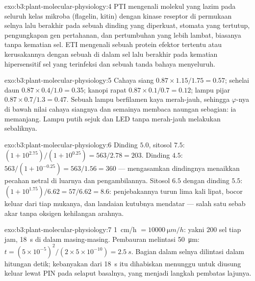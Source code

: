 \begin{solution}{exo:b3:plant-molecular-physiology:4}
PTI mengenali molekul yang lazim pada seluruh kelas mikroba
(flagelin, kitin) dengan kinase reseptor di permukaan selnya lalu berakhir
pada sebuah dinding yang diperkuat, stomata yang tertutup, pengungkapan gen pertahanan, dan
pertumbuhan yang lebih lambat, biasanya tanpa kematian sel. ETI mengenali sebuah
protein efektor tertentu atau kerusakannya dengan sebuah  di dalam sel lalu
berakhir pada kematian hipersensitif sel yang terinfeksi dan sebuah tanda bahaya
menyeluruh.
\end{solution}

\begin{solution}{exo:b3:plant-molecular-physiology:5}
Cahaya siang $0.87\times 1.15/1.75 = 0.57$; sehelai daun $0.87\times 0.4/1.0 =
0.35$; kanopi rapat $0.87\times 0.1/0.7 = 0.12$; lampu pijar
$0.87\times 0.7/1.3 = 0.47$. Sebuah lampu berfilamen kaya merah-jauh, sehingga
$\varphi$-nya di bawah nilai cahaya siangnya dan semainya membaca naungan sebagian:
ia memanjang. Lampu putih sejuk dan LED tanpa merah-jauh melakukan
sebaliknya.
\end{solution}

\begin{solution}{exo:b3:plant-molecular-physiology:6}
Dinding $5.0$, sitosol $7.5$: $(1 + 10^{2.75})/(1 + 10^{0.25}) = 563/2.78
= 203$. Dinding $4.5$: $563/(1 + 10^{-0.25}) = 563/1.56 = 360$ ---
mengasamkan dindingnya menaikkan pecahan netral di luarnya dan pengambilannya.
Sitosol $6.5$ dengan dinding $5.5$: $(1 + 10^{1.75})/6.62 = 57/6.62 = 8.6$:
penjebakannya turun lima kali lipat,  bocor keluar dari tiap mukanya, dan
landaian kutubnya mendatar --- salah satu sebab akar tanpa oksigen kehilangan arahnya.
\end{solution}

\begin{solution}{exo:b3:plant-molecular-physiology:7}
\qty{1}{cm/h} $= \qty{10000}{\micro m/h}$: yakni $200$ sel tiap jam,
\qty{18}{s} di dalam masing-masing. Pembauran melintasi \qty{50}{\micro m}: $t =
(5\times 10^{-5})^{2}/(2\times 5\times 10^{-10}) = \qty{2.5}{s}$. Bagian
dalam selnya dilintasi dalam hitungan detik; kebanyakan dari \qty{18}{s} itu
dihabiskan menunggu untuk diusung keluar lewat PIN pada selaput
basalnya, yang menjadi langkah pembatas lajunya.
\end{solution}

